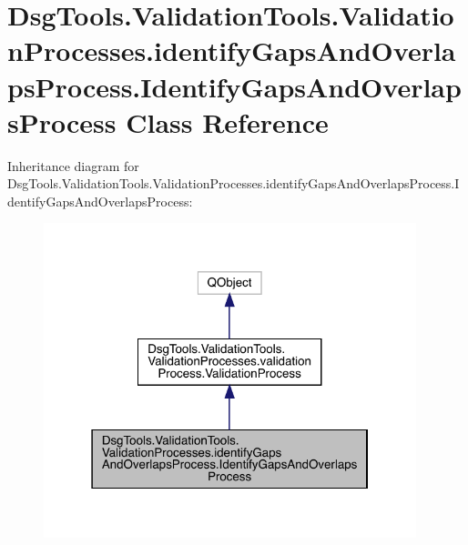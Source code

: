 \hypertarget{class_dsg_tools_1_1_validation_tools_1_1_validation_processes_1_1identify_gaps_and_overlaps_proc6c71562b24620a794ca7de9d16d249e2}{}\section{Dsg\+Tools.\+Validation\+Tools.\+Validation\+Processes.\+identify\+Gaps\+And\+Overlaps\+Process.\+Identify\+Gaps\+And\+Overlaps\+Process Class Reference}
\label{class_dsg_tools_1_1_validation_tools_1_1_validation_processes_1_1identify_gaps_and_overlaps_proc6c71562b24620a794ca7de9d16d249e2}


Inheritance diagram for Dsg\+Tools.\+Validation\+Tools.\+Validation\+Processes.\+identify\+Gaps\+And\+Overlaps\+Process.\+Identify\+Gaps\+And\+Overlaps\+Process\+:
\nopagebreak
\begin{figure}[H]
\begin{center}
\leavevmode
\includegraphics[width=307pt]{class_dsg_tools_1_1_validation_tools_1_1_validation_processes_1_1identify_gaps_and_overlaps_procbdea10e4a9110e3f80985cc62ad671fb}
\end{center}
\end{figure}


